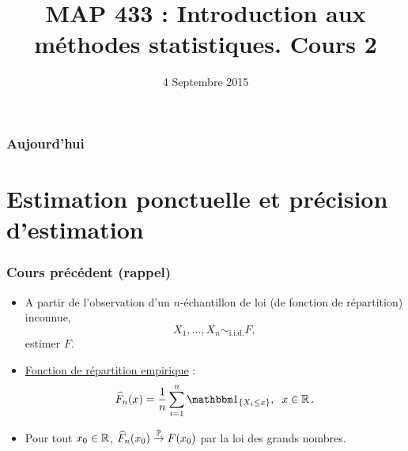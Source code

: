 
\title{MAP 433 : Introduction aux méthodes statistiques. Cours 2}
\date{4 Septembre 2015}

\maketitle


\begin{frame}
\frametitle{Aujourd'hui}
\tableofcontents
\section{Estimation ponctuelle et précision d'estimation}

\end{frame}

\begin{frame}
\frametitle{Cours précédent (rappel)}
\begin{itemize}
\item A partir de l'observation d'un $n$-échantillon de loi (de fonction de répartition) inconnue,
$$X_1,\ldots, X_n \sim_{\text{i.i.d.}}F,$$
\alert{estimer} $F$.
\item \underline{Fonction de répartition empirique} :
$$\widehat F_n(x) = \frac{1}{n}\sum_{i = 1}^n \indi{X_i \leq x},\;\;x \in \R.$$
\item Pour tout $x_0 \in \operatorname{{\mathbb R}}$, $\widehat F_n(x_0) \stackrel{\operatorname{{\mathbb P}}}{\rightarrow}F(x_0)$ par la loi des grands nombres.
\end{itemize}
\end{frame}


